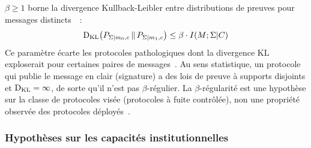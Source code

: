 \begin{sloppypar}
\begin{definition}
\end{definition}

\begin{definition}\label{def:beta_regularite}

$\beta \geq 1$ borne la divergence Kullback-Leibler entre distributions de
preuves pour messages distincts~\cite{Kullback1951,CoverThomas06}~:
\begin{equation}
\operatorname{D_{\text{KL}}}\!\left(P_{\Sigma|m_0,c} \,\|\, P_{\Sigma|m_1,c}\right) \leq \beta \cdot I(M;\Sigma|C)
\label{eq:beta_definition}
\end{equation}
Ce param\`etre \'ecarte les protocoles pathologiques dont la divergence KL exploserait
pour certaines paires de messages~\cite{Tsybakov2009}. Au sens statistique, un protocole
qui publie le message en clair (signature) a des lois de preuve \`a supports disjoints
et $\operatorname{D_{\text{KL}}} = \infty$, de sorte qu'il n'est pas $\beta$-r\'egulier. La $\beta$-r\'egularit\'e est une
hypoth\`ese sur la classe de protocoles vis\'ee (protocoles \`a fuite contr\^ol\'ee), non
une propri\'et\'e observ\'ee des protocoles d\'eploy\'es~\cite{Pedersen91,Groth16}.

\end{definition}
\end{sloppypar}

\subsubsection{Hypoth\`eses sur les capacit\'es institutionnelles}
\label{subsubsec:hypotheses_capacite}

